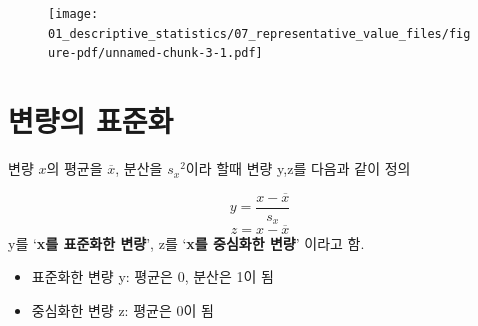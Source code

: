 \documentclass[
  letterpaper,
  DIV=11,
  numbers=noendperiod]{scrreprt}
\newenvironment{Shaded}{\begin{snugshade}}{\end{snugshade}}
\newcommand{\AttributeTok}[1]{\textcolor[rgb]{0.40,0.45,0.13}{#1}}
\newcommand{\DecValTok}[1]{\textcolor[rgb]{0.68,0.00,0.00}{#1}}
\newcommand{\FloatTok}[1]{\textcolor[rgb]{0.68,0.00,0.00}{#1}}
\newcommand{\FunctionTok}[1]{\textcolor[rgb]{0.28,0.35,0.67}{#1}}
\newcommand{\NormalTok}[1]{\textcolor[rgb]{0.00,0.23,0.31}{#1}}
\newcommand{\SpecialCharTok}[1]{\textcolor[rgb]{0.37,0.37,0.37}{#1}}
\newcommand{\StringTok}[1]{\textcolor[rgb]{0.13,0.47,0.30}{#1}}
\providecommand{\tightlist}{%
  \setlength{\itemsep}{0pt}\setlength{\parskip}{0pt}}\usepackage{longtable,booktabs,array}
\begin{document}
\begin{Shaded}
\end{Shaded}

\begin{figure}[H]

{\centering \texttt{[image: 01\_descriptive\_statistics/07\_representative\_value\_files/figure-pdf/unnamed-chunk-3-1.pdf]}

}

\end{figure}

\hypertarget{uxbcc0uxb7c9uxc758-uxd45cuxc900uxd654}{%
\chapter{변량의 표준화}\label{uxbcc0uxb7c9uxc758-uxd45cuxc900uxd654}}

변량 \(x\)의 평균을 \(\overline{x}\), 분산을 \({s_x }^2\)이라 할때 변량
y,z를 다음과 같이 정의

\[y = \frac{x - \overline{x}}{s_x}\] \[z = x - \overline{x}\] y를
`\textbf{x를 표준화한 변량}', z를 `\textbf{x를 중심화한 변량}' 이라고
함.

\begin{itemize}
\tightlist
\item
  표준화한 변량 y: 평균은 0, 분산은 1이 됨
\item
  중심화한 변량 z: 평균은 0이 됨
\end{itemize}
\end{document}
